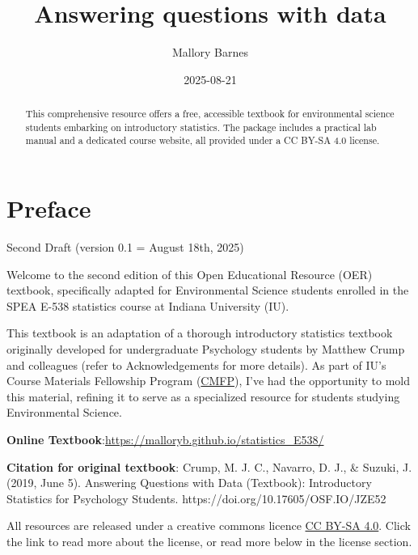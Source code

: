 \documentclass[
  letterpaper,
  DIV=11,
  numbers=noendperiod]{scrreprt}
\title{Answering questions with data}
\author{Mallory Barnes}
\date{2025-08-21}
\renewcommand*\contentsname{Table of contents}
\newcommand\contentsname{Table of contents}
\begin{document}
\maketitle
\begin{abstract}
This comprehensive resource offers a free, accessible textbook for
environmental science students embarking on introductory statistics. The
package includes a practical lab manual and a dedicated course website,
all provided under a CC BY-SA 4.0 license.
\end{abstract}

\renewcommand*\contentsname{Table of contents}
{
\hypersetup{linkcolor=}
\setcounter{tocdepth}{2}
\tableofcontents
}


\chapter*{Preface}\label{preface}


Second Draft (version 0.1 = August 18th, 2025)

Welcome to the second edition of this Open Educational Resource (OER)
textbook, specifically adapted for Environmental Science students
enrolled in the SPEA E-538 statistics course at Indiana University (IU).

This textbook is an adaptation of a thorough introductory statistics
textbook originally developed for undergraduate Psychology students by
Matthew Crump and colleagues (refer to Acknowledgements for more
details). As part of IU's Course Materials Fellowship Program
(\href{https://libraries.indiana.edu/course-material-fellowship-program-1}{CMFP}),
I've had the opportunity to mold this material, refining it to serve as
a specialized resource for students studying Environmental Science.

\textbf{Online
Textbook}:\url{https://malloryb.github.io/statistics_E538/}

\textbf{Citation for original textbook}: Crump, M. J. C., Navarro, D.
J., \& Suzuki, J. (2019, June 5). Answering Questions with Data
(Textbook): Introductory Statistics for Psychology Students.
https://doi.org/10.17605/OSF.IO/JZE52

All resources are released under a creative commons licence
\href{https://creativecommons.org/licenses/by-sa/4.0/}{CC BY-SA 4.0}.
Click the link to read more about the license, or read more below in the
license section.
\end{document}
